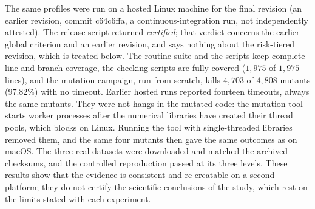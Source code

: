 \documentclass[conference]{IEEEtran}
\begin{document}
The same profiles were run on a hosted Linux machine for the final revision
(an earlier revision, commit c64c6ffa, a continuous-integration run, not independently attested).
The release script returned \emph{certified}; that verdict concerns the earlier global criterion and an earlier revision, and says nothing about the risk-tiered revision, which is treated below. The routine suite and the scripts
keep complete line and branch coverage, the checking scripts are fully covered
($1{,}975$ of $1{,}975$ lines), and the mutation campaign, run from scratch,
kills $4{,}703$ of $4{,}808$ mutants ($97.82\%$) with no timeout. Earlier hosted
runs reported fourteen timeouts, always the same mutants. They were not hangs in
the mutated code: the mutation tool starts worker processes after the numerical
libraries have created their thread pools, which blocks on Linux. Running the
tool with single-threaded libraries removed them, and the same four mutants then
gave the same outcomes as on macOS. The three real datasets were downloaded and
matched the archived checksums, and the controlled reproduction passed at its
three levels. These results show that the evidence is consistent and
re-creatable on a second platform; they do not certify the scientific
conclusions of the study, which rest on the limits stated with each experiment.
\end{document}
